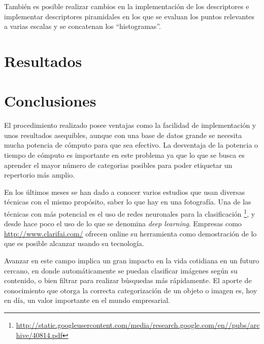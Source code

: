 \documentclass[a4paper,12pt]{article}
\begin{document}
También es posible realizar cambios en la implementación de los descriptores e 
implementar descriptores piramidales en los que se evaluan los puntos relevantes
a varias escalas y se concatenan los ``histogramas''.


\newpage
\section{Resultados}




\newpage
\section{Conclusiones}

El procedimiento realizado posee ventajas como la facilidad de implementación
y unos resultados asequibles, aunque con una base de datos grande se necesita
mucha potencia de cómputo para que sea efectivo. La desventaja de la potencia o 
tiempo de cómputo es importante en este problema ya que lo que se busca es 
aprender el mayor número de categorias posibles para poder etiquetar un 
repertorio más amplio. 

En los últimos meses se han dado a conocer varios estudios que usan diversas 
técnicas con el mismo propósito, saber lo que hay en una fotografía. Una de las
técnicas con más potencial es el uso de redes neuronales para la clasificación
\footnote{\url{http://static.googleusercontent.com/media/research.google.com/en//pubs/archive/40814.pdf}},
y desde hace poco el uso de lo que se denomina \emph{deep learning}. Empresas como
\url{http://www.clarifai.com/} ofrecen online su herramienta como demostración
de lo que es posible alcanzar usando su tecnología.

Avanzar en este campo implica un gran impacto en la vida cotidiana en un futuro
cercano, en donde automáticamente se puedan clasificar imágenes según su 
contenido, o bien filtrar para realizar búsquedas más rápidamente. El aporte de 
conocimiento que otorga la correcta categorización de un objeto o imagen es, 
hoy en día, un valor importante en el mundo empresarial. 
\end{document}
